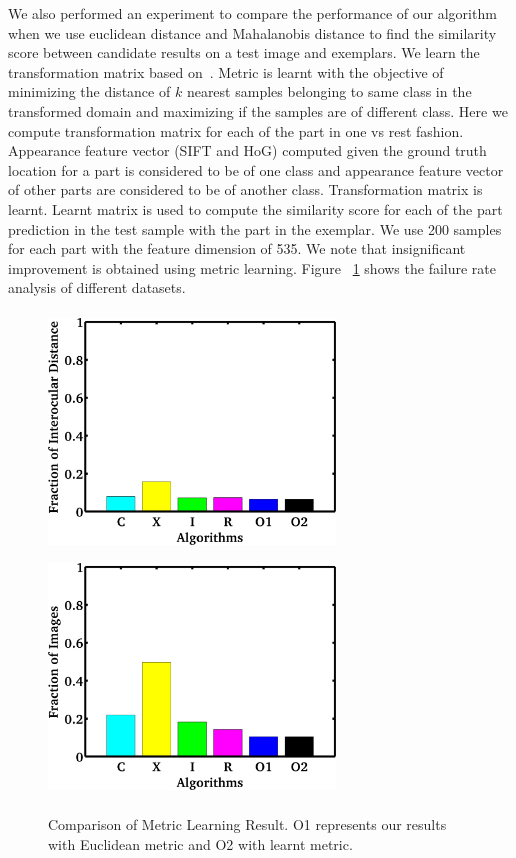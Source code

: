 We also performed an experiment to compare the performance of our algorithm when we use euclidean distance and
Mahalanobis distance to find the similarity score between candidate results on a test image and exemplars. 
We learn the transformation matrix based on~\cite{weinberger09distance}. Metric is learnt with the objective of
minimizing the distance of $k$ nearest samples belonging to same class in the transformed domain and
maximizing if the samples are of different class. Here we compute transformation matrix for each of
the part in one vs rest fashion. Appearance feature vector (SIFT and HoG) computed given the ground
truth location for a part is considered to be of one class and appearance feature vector of other
parts are considered to be of another class. Transformation matrix is learnt. Learnt matrix is used
to compute the similarity score for each of the part prediction in the test sample with the part in
the exemplar. We use 200 samples for each part with the feature dimension of 535. 
We note that insignificant improvement is obtained using metric learning.
Figure ~\ref{fig:metric_learning} shows the failure rate analysis of different datasets. 

\begin{figure}
  \centering
  \includegraphics[width=3.0in,height=2.5in]{fid/figures/iccv_version_one/cofw/wo_metric_vs_w_metric/mean_err_modified.jpg}
  \includegraphics[width=3.0in,height=2.5in]{fid/figures/iccv_version_one/cofw/wo_metric_vs_w_metric/fail_rate_modified.jpg}
  \caption{ Comparison of Metric Learning Result. O1 represents our results with Euclidean metric and O2 with learnt metric.}
  \label{fig:metric_learning}
\end{figure}
